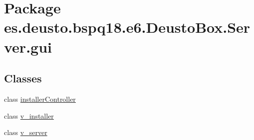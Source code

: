 \hypertarget{namespacees_1_1deusto_1_1bspq18_1_1e6_1_1_deusto_box_1_1_server_1_1gui}{}\section{Package es.\+deusto.\+bspq18.\+e6.\+Deusto\+Box.\+Server.\+gui}
\label{namespacees_1_1deusto_1_1bspq18_1_1e6_1_1_deusto_box_1_1_server_1_1gui}
\subsection*{Classes}
\begin{DoxyCompactItemize}
\item 
class \mbox{\hyperlink{classes_1_1deusto_1_1bspq18_1_1e6_1_1_deusto_box_1_1_server_1_1gui_1_1installer_controller}{installer\+Controller}}
\item 
class \mbox{\hyperlink{classes_1_1deusto_1_1bspq18_1_1e6_1_1_deusto_box_1_1_server_1_1gui_1_1v__installer}{v\+\_\+installer}}
\item 
class \mbox{\hyperlink{classes_1_1deusto_1_1bspq18_1_1e6_1_1_deusto_box_1_1_server_1_1gui_1_1v__server}{v\+\_\+server}}
\end{DoxyCompactItemize}
